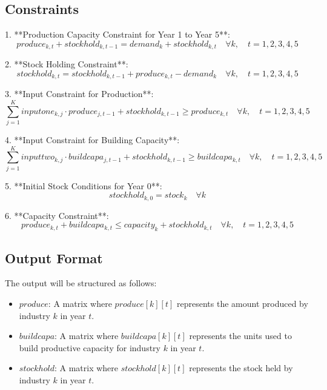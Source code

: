 \documentclass{article}
\begin{document}
\subsection*{Constraints}

1. **Production Capacity Constraint for Year 1 to Year 5**:
\[
produce_{k,t} + stockhold_{k,t-1} = demand_k + stockhold_{k,t} \quad \forall k, \quad t = 1, 2, 3, 4, 5
\]

2. **Stock Holding Constraint**:
\[
stockhold_{k,t} = stockhold_{k,t-1} + produce_{k,t} - demand_k \quad \forall k, \quad t = 1, 2, 3, 4, 5
\]

3. **Input Constraint for Production**:
\[
\sum_{j=1}^{K} inputone_{k,j} \cdot produce_{j,t-1} + stockhold_{k,t-1} \geq produce_{k,t} \quad \forall k, \quad t = 1, 2, 3, 4, 5
\]

4. **Input Constraint for Building Capacity**:
\[
\sum_{j=1}^{K} inputtwo_{k,j} \cdot buildcapa_{j,t-1} + stockhold_{k,t-1} \geq buildcapa_{k,t} \quad \forall k, \quad t = 1, 2, 3, 4, 5
\]

5. **Initial Stock Conditions for Year 0**:
\[
stockhold_{k,0} = stock_k \quad \forall k
\]

6. **Capacity Constraint**:
\[
produce_{k,t} + buildcapa_{k,t} \leq capacity_k + stockhold_{k,t} \quad \forall k, \quad t = 1, 2, 3, 4, 5
\]

\subsection*{Output Format}
The output will be structured as follows:
\begin{itemize}
    \item \( produce \): A matrix where \( produce[k][t] \) represents the amount produced by industry \( k \) in year \( t \).
    \item \( buildcapa \): A matrix where \( buildcapa[k][t] \) represents the units used to build productive capacity for industry \( k \) in year \( t \).
    \item \( stockhold \): A matrix where \( stockhold[k][t] \) represents the stock held by industry \( k \) in year \( t \).
\end{itemize}
\end{document}
